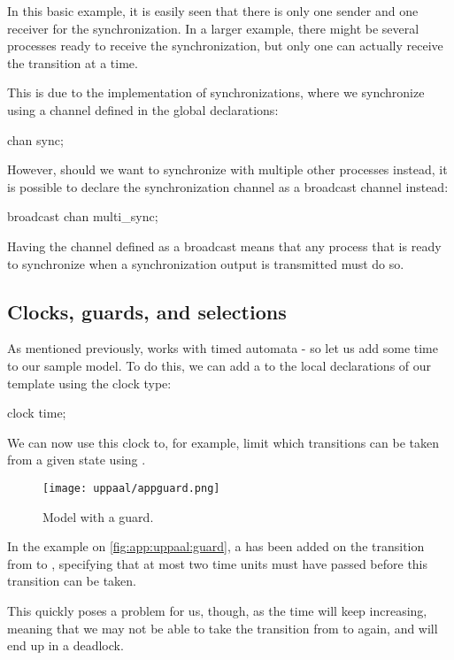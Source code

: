 In this basic example, it is easily seen that there is only one sender and one receiver for the synchronization.
In a larger example, there might be several processes ready to receive the synchronization, but only one can actually receive the transition at a time.

This is due to the implementation of synchronizations, where we synchronize using a channel defined in the global declarations:

\begin{uppaalcode}
chan sync;
\end{uppaalcode}
\noindent
However, should we want to synchronize with multiple other processes instead, it is possible to declare the synchronization channel as a broadcast channel instead:

\begin{uppaalcode}
broadcast chan multi_sync;
\end{uppaalcode}
\noindent
Having the channel defined as a broadcast means that any process that is ready to synchronize when a synchronization output is transmitted must do so.


\subsection{Clocks, guards, and selections}
As mentioned previously, \uppaal works with timed automata - so let us add some time to our sample model.
To do this, we can add a  to the local declarations of our template using the clock type:
\begin{uppaalcode}
clock time;
\end{uppaalcode}
\noindent
We can now use this clock to, for example, limit which transitions can be taken from a given state using .

\begin{figure}[H]
    \centering
    \texttt{[image: uppaal/appguard.png]}
    \caption{Model with a guard.}
    \label{fig:app:uppaal:guard}
\end{figure}
\noindent
In the example on \autoref{fig:app:uppaal:guard}, a  has been added on the transition from  to , specifying that at most two time units must have passed before this transition can be taken.

This quickly poses a problem for us, though, as the time will keep increasing, meaning that we may not be able to take the transition from  to  again, and will end up in a deadlock.

